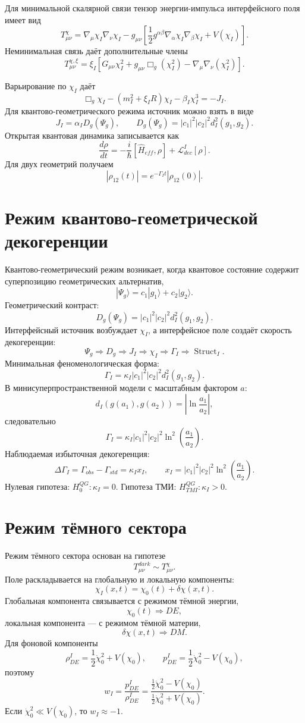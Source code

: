 \documentclass[12pt,a4paper]{article}
\DeclareMathOperator{\Struct}{Struct}
\begin{document}
Для минимальной скалярной связи тензор энергии-импульса интерфейсного поля имеет вид
\[
\boxed{
T_{\mu\nu}^{\chi}
=
\nabla_\mu\chi_I\nabla_\nu\chi_I
-g_{\mu\nu}\left[\frac12 g^{\alpha\beta}\nabla_\alpha\chi_I\nabla_\beta\chi_I+V(\chi_I)\right].
}
\]
Неминимальная связь даёт дополнительные члены
\[
\boxed{
T_{\mu\nu}^{\chi,\xi}
=\xi_I\left[G_{\mu\nu}\chi_I^2+g_{\mu\nu}\Box_g(\chi_I^2)-\nabla_\mu\nabla_\nu(\chi_I^2)\right].
}
\]

Варьирование по $\chi_I$ даёт
\[
\boxed{
\Box_g\chi_I-(m_I^2+\xi_I R)\chi_I-\beta_I\chi_I^3=-J_I.
}
\]
Для квантово-геометрического режима источник можно взять в виде
\[
\boxed{
J_I=\alpha_I D_g(\Psi_g),
\qquad
D_g(\Psi_g)=|c_1|^2|c_2|^2d_I^2(g_1,g_2).
}
\]
Открытая квантовая динамика записывается как
\[
\boxed{
\frac{d\rho}{dt}=-\frac{i}{\hbar}[\widehat H_{eff},\rho]+\mathcal L_{dec}^{I}[\rho].
}
\]
Для двух геометрий получаем
\[
\boxed{|\rho_{12}(t)|=e^{-\Gamma_I t}|\rho_{12}(0)|.}
\]

\section{Режим квантово-геометрической декогеренции}
Квантово-геометрический режим возникает, когда квантовое состояние содержит суперпозицию геометрических альтернатив,
\[
|\Psi_g\rangle=c_1|g_1\rangle+c_2|g_2\rangle.
\]
Геометрический контраст:
\[
\boxed{
D_g(\Psi_g)=|c_1|^2|c_2|^2d_I^2(g_1,g_2).
}
\]
Интерфейсный источник возбуждает $\chi_I$, а интерфейсное поле создаёт скорость декогеренции:
\[
\boxed{
\Psi_g\Rightarrow D_g\Rightarrow J_I\Rightarrow \chi_I\Rightarrow \Gamma_I\Rightarrow \Struct_I.
}
\]
Минимальная феноменологическая форма:
\[
\boxed{
\Gamma_I=\kappa_I|c_1|^2|c_2|^2d_I^2(g_1,g_2).
}
\]
В минисуперпространственной модели с масштабным фактором $a$:
\[
\boxed{
d_I(g(a_1),g(a_2))=\left|\ln\frac{a_1}{a_2}\right|,
}
\]
следовательно
\[
\boxed{
\Gamma_I=\kappa_I|c_1|^2|c_2|^2\ln^2\left(\frac{a_1}{a_2}\right).
}
\]
Наблюдаемая избыточная декогеренция:
\[
\boxed{
\Delta\Gamma_I=\Gamma_{obs}-\Gamma_{std}=\kappa_I x_I,
\qquad
x_I=|c_1|^2|c_2|^2\ln^2\left(\frac{a_1}{a_2}\right).
}
\]
Нулевая гипотеза: $H_0^{QG}:\kappa_I=0$. Гипотеза ТМИ: $H_{TMI}^{QG}:\kappa_I>0$.

\section{Режим тёмного сектора}
Режим тёмного сектора основан на гипотезе
\[
\boxed{
T_{\mu\nu}^{dark}\sim T_{\mu\nu}^{\chi}.
}
\]
Поле раскладывается на глобальную и локальную компоненты:
\[
\boxed{\chi_I(x,t)=\chi_0(t)+\delta\chi(x,t).}
\]
Глобальная компонента связывается с режимом тёмной энергии,
\[
\boxed{\chi_0(t)\Rightarrow DE,}
\]
локальная компонента — с режимом тёмной материи,
\[
\boxed{\delta\chi(x,t)\Rightarrow DM.}
\]
Для фоновой компоненты
\[
\boxed{
\rho_{DE}^{I}=\frac12\dot\chi_0^2+V(\chi_0),
\qquad
p_{DE}^{I}=\frac12\dot\chi_0^2-V(\chi_0),
}
\]
поэтому
\[
\boxed{
w_I=\frac{p_{DE}^{I}}{\rho_{DE}^{I}}
=\frac{\frac12\dot\chi_0^2-V(\chi_0)}{\frac12\dot\chi_0^2+V(\chi_0)}.
}
\]
Если $\dot\chi_0^2\ll V(\chi_0)$, то $w_I\approx -1$.
\end{document}
